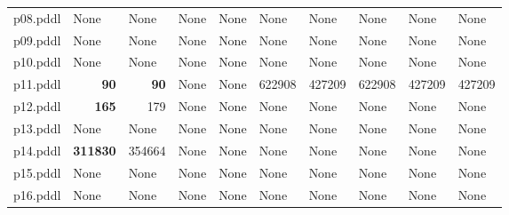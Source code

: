 \documentclass{article}
\begin{document}
\begin{tabular}{@{}lrrrrrrrrr@{}}
p08.pddl & \multicolumn{1}{|l|}{None} & \multicolumn{1}{|l|}{None} & \multicolumn{1}{|l|}{None} & \multicolumn{1}{|l|}{None} & \multicolumn{1}{|l|}{None} & \multicolumn{1}{|l|}{None} & \multicolumn{1}{|l|}{None} & \multicolumn{1}{|l|}{None} & \multicolumn{1}{|l|}{None} \\
p09.pddl & \multicolumn{1}{|l|}{None} & \multicolumn{1}{|l|}{None} & \multicolumn{1}{|l|}{None} & \multicolumn{1}{|l|}{None} & \multicolumn{1}{|l|}{None} & \multicolumn{1}{|l|}{None} & \multicolumn{1}{|l|}{None} & \multicolumn{1}{|l|}{None} & \multicolumn{1}{|l|}{None} \\
p10.pddl & \multicolumn{1}{|l|}{None} & \multicolumn{1}{|l|}{None} & \multicolumn{1}{|l|}{None} & \multicolumn{1}{|l|}{None} & \multicolumn{1}{|l|}{None} & \multicolumn{1}{|l|}{None} & \multicolumn{1}{|l|}{None} & \multicolumn{1}{|l|}{None} & \multicolumn{1}{|l|}{None} \\
p11.pddl & \textbf{90} & \textbf{90} & \multicolumn{1}{|l|}{None} & \multicolumn{1}{|l|}{None} & 622908 & 427209 & 622908 & 427209 & 427209 \\
p12.pddl & \textbf{165} & 179 & \multicolumn{1}{|l|}{None} & \multicolumn{1}{|l|}{None} & \multicolumn{1}{|l|}{None} & \multicolumn{1}{|l|}{None} & \multicolumn{1}{|l|}{None} & \multicolumn{1}{|l|}{None} & \multicolumn{1}{|l|}{None} \\
p13.pddl & \multicolumn{1}{|l|}{None} & \multicolumn{1}{|l|}{None} & \multicolumn{1}{|l|}{None} & \multicolumn{1}{|l|}{None} & \multicolumn{1}{|l|}{None} & \multicolumn{1}{|l|}{None} & \multicolumn{1}{|l|}{None} & \multicolumn{1}{|l|}{None} & \multicolumn{1}{|l|}{None} \\
p14.pddl & \textbf{311830} & 354664 & \multicolumn{1}{|l|}{None} & \multicolumn{1}{|l|}{None} & \multicolumn{1}{|l|}{None} & \multicolumn{1}{|l|}{None} & \multicolumn{1}{|l|}{None} & \multicolumn{1}{|l|}{None} & \multicolumn{1}{|l|}{None} \\
p15.pddl & \multicolumn{1}{|l|}{None} & \multicolumn{1}{|l|}{None} & \multicolumn{1}{|l|}{None} & \multicolumn{1}{|l|}{None} & \multicolumn{1}{|l|}{None} & \multicolumn{1}{|l|}{None} & \multicolumn{1}{|l|}{None} & \multicolumn{1}{|l|}{None} & \multicolumn{1}{|l|}{None} \\
p16.pddl & \multicolumn{1}{|l|}{None} & \multicolumn{1}{|l|}{None} & \multicolumn{1}{|l|}{None} & \multicolumn{1}{|l|}{None} & \multicolumn{1}{|l|}{None} & \multicolumn{1}{|l|}{None} & \multicolumn{1}{|l|}{None} & \multicolumn{1}{|l|}{None} & \multicolumn{1}{|l|}{None} \\

\end{tabular}
\end{document}
